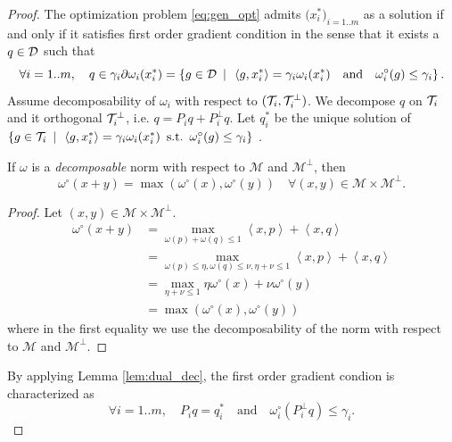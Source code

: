 \documentclass{article}
\begin{document}
\begin{proof}
The optimization problem \ref{eq:gen_opt} admits $\big(x_{i}^*\big)_{i=1..m}$ as a solution if and only if it satisfies first order gradient condition in the sense that it exists a $q\in\mathcal{D}$ such that
$$
\forall{i}=1..m, \quad q\in\gamma_{i}\partial\omega_{i}(x_i^*)=\left\lbrace g\in\mathcal{D}  \enspace|\enspace \left\langle g,x_i^* \right\rangle = \gamma_i\omega_{i}(x_i^*) \quad \text{and} \quad \omega_{i}^{\circ}(g)\leq \gamma_i  \right\rbrace.
$$
Assume decomposability of $\omega_i$ with respect to $(\mathcal{T}_i,\mathcal{T}_i^{\perp})$. We decompose $q$ on  $\mathcal{T}_i$ and it orthogonal $\mathcal{T}_i^{\perp}$, i.e. $q=P_i q+P_i^{\perp} q$. 
Let $q_i^*$ be the unique solution of $\left\lbrace g \in \mathcal{T}_i \enspace|\enspace \left\langle g,x_i^* \right\rangle = \gamma_i\omega_{i}(x_i^*) \enspace\text{s.t.}\enspace  \omega_{i}^{\circ}(g)\leq \gamma_i\right\rbrace$ . 
\begin{lemma}
\label{lem:dual_dec}
If $\omega$ is a \emph{decomposable} norm with respect to $\mathcal{M}$ and $\mathcal{M}^{\perp}$, then
$$
\omega^{\circ}(x+y)=\max(\omega^{\circ}(x),\omega^{\circ}(y))  \quad \forall (x,y)\in\mathcal{M}\times\mathcal{M}^{\perp}.
$$
\end{lemma}
\begin{proof}
Let $(x,y)\in\mathcal{M}\times\mathcal{M}^{\perp}$. 
\begin{align*}
\omega^{\circ}(x+y) 
&= \max_{\omega(p)+\omega(q)\leq 1} \left\langle x,p\right\rangle + \left\langle x,q\right\rangle  \\
&= \max_{\omega(p)\leq \eta, \omega(q)\leq \nu, \eta+ \nu \leq 1} \left\langle x,p\right\rangle + \left\langle x,q\right\rangle  \\
&= \max_{\eta+ \nu \leq 1} \eta\omega^{\circ}(x)+\nu\omega^{\circ}(y)\\
&= \max(\omega^{\circ}(x),\omega^{\circ}(y))
\end{align*}
where in the first equality we use the decomposability of the norm  with respect to $\mathcal{M}$ and $\mathcal{M}^{\perp}$.
\end{proof}

By applying Lemma \ref{lem:dual_dec}, the first order gradient condion is characterized as 
$$
\forall{i}=1..m, \quad P_i q=q_i^* \quad \text{and} \quad \omega_i^\circ(P_i^{\perp} q)\leq \gamma_i.
$$


\end{proof}
\end{document}
